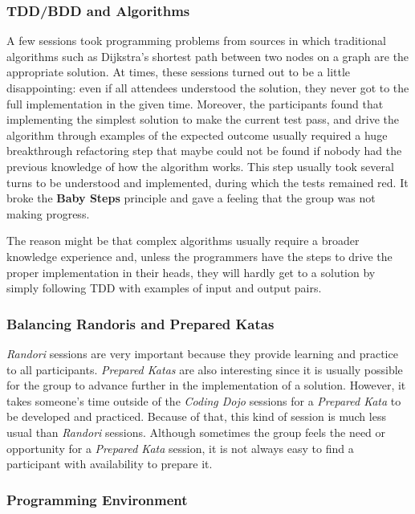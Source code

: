\subsubsection{TDD/BDD and Algorithms}

A few sessions took programming problems from sources in which
traditional algorithms such as Dijkstra's shortest path between two
nodes on a graph are the appropriate solution. At times, these
sessions turned out to be a little disappointing: even if all
attendees understood the solution, they never got to the full
implementation in the given time. Moreover, the participants found
that implementing the simplest solution to make the current test pass,
and drive the algorithm through examples of the expected outcome
usually required a huge breakthrough refactoring step that maybe could
not be found if nobody had the previous knowledge of how the algorithm
works. This step usually took several turns to be understood and
implemented, during which the tests remained red. It broke the
\textbf{Baby Steps} principle and gave a feeling that the group was not making
progress.

The reason might be that complex algorithms usually require a broader
knowledge experience and, unless the programmers have the steps to
drive the proper implementation in their heads, they will hardly get
to a solution by simply following TDD with examples of input and
output pairs.

\subsubsection{Balancing Randoris and Prepared Katas}

\emph{Randori} sessions are very important because they provide
learning and practice to all participants. \emph{Prepared Katas} are
also interesting since it is usually possible for the group to advance
further in the implementation of a solution. However, it takes
someone's time outside of the \emph{Coding Dojo} sessions for a
\emph{Prepared Kata} to be developed and practiced. Because of that,
this kind of session is much less usual than \emph{Randori} sessions.
Although sometimes the group feels the need or opportunity for a
\emph{Prepared Kata} session, it is not always easy to find a participant
with availability to prepare it.

\subsubsection{Programming Environment}

